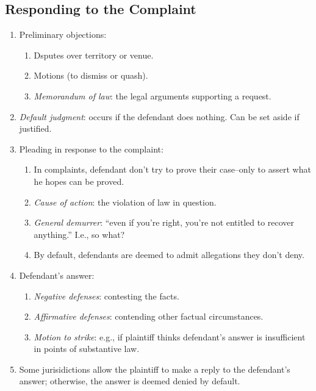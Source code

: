 \subsection{Responding to the Complaint}

\begin{enumerate}
    \item Preliminary objections:
    \begin{enumerate}
        \item Dsputes over territory or venue.
        \item Motions (to dismiss or quash).
        \item \emph{Memorandum of law}: the legal arguments supporting a 
        request.
    \end{enumerate}
    \item \emph{Default judgment}: occurs if the defendant does nothing. Can 
    be set aside if justified.
    \item Pleading in response to the complaint:
    \begin{enumerate}
        \item In complaints, defendant don't try to prove their case--only to 
        assert what he hopes can be proved.
        \item \emph{Cause of action}: the violation of law in question.
        \item \emph{General demurrer}: ``even if you're right, you're not 
        entitled to recover anything.'' I.e., so what?
        \item By default, defendants are deemed to admit allegations they 
        don't deny.
    \end{enumerate}
    \item Defendant's answer:
    \begin{enumerate}
        \item \emph{Negative defenses}: contesting the facts.
        \item \emph{Affirmative defenses}: contending other factual 
        circumstances.
        \item \emph{Motion to strike}: e.g., if plaintiff thinks defendant's 
        answer is insufficient in points of substantive law.
    \end{enumerate}
    \item Some jurisidictions allow the plaintiff to make a reply to the 
    defendant's answer; otherwise, the answer is deemed denied by default.
\end{enumerate}

